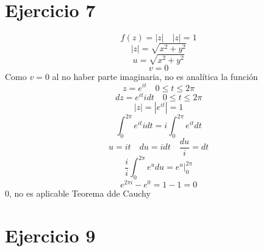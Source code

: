 \documentclass{article}
\begin{document}
\section{Ejercicio 7}
\[
f(z)=|z|\quad |z|=1
\]
\begin{equation}
|z|=\sqrt{x^2+y^2}
\end{equation}
\begin{equation}
u=\sqrt{x^2+y^2}
\end{equation}
\begin{equation}
v=0
\end{equation}
Como \( v=0\) al no haber parte imaginaria, no es analítica la función 
\begin{equation}
z=e^{it} \quad 0\leq t\leq 2\pi
\end{equation}
\begin{equation}
dz=e^{it}idt \quad 0\leq t\leq 2\pi
\end{equation}
\begin{equation}
|z|=|e^{it}|=1
\end{equation}
\begin{equation}
\int_{0}^{2\pi}e^{it}idt =i\int_{0}^{2\pi}e^{it}dt
\end{equation}
\begin{equation}
u=it \quad du= idt \quad \frac{du}{i}=dt
\end{equation}
\begin{equation}
\frac{i}{i}\int_{0}^{2\pi}e^{u}du= \left.e^u\right|_{0}^{2\pi}
\end{equation}
\begin{equation}
e^{2\pi i}-e^0=1-1=0
\end{equation}
0, no es aplicable Teorema dde Cauchy


\section{Ejercicio 9}
\end{document}
